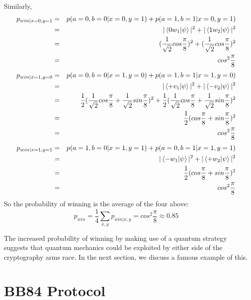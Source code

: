 Similarly,
\begin{eqnarray*}
p_{win|x=0,y=1}&=&p(a=0, b=0|x=0, y=1)+p(a=1, b=1|x=0, y=1)\\
&=&|\braket{0 w_1|\psi}|^2 + |\braket{1 w_2|\psi}|^2\\
&=&(\frac{1}{\sqrt{2}}cos\frac{\pi}{8})^2+(\frac{1}{\sqrt{2}}cos\frac{\pi}{8})^2\\
&=&cos^2 \frac{\pi}{8}
\end{eqnarray*}
\begin{eqnarray*}
p_{win|x=1,y=0}&=&p(a=0, b=0|x=1, y=0)+p(a=1, b=1|x=1, y=0)\\
&=&|\braket{+ v_1|\psi}|^2 + |\braket{- v_2|\psi}|^2\\
&=&\frac{1}{2}(\frac{1}{\sqrt{2}}cos\frac{\pi}{8}+\frac{1}{\sqrt{2}}sin\frac{\pi}{8})^2+\frac{1}{2}(\frac{1}{\sqrt{2}}cos\frac{\pi}{8}+\frac{1}{\sqrt{2}}sin\frac{\pi}{8})^2\\
&=&\frac{1}{2}(cos\frac{\pi}{8}+sin\frac{\pi}{8})^2\\
&=&cos^2 \frac{\pi}{8}
\end{eqnarray*}
\begin{eqnarray*}
p_{win|x=1,y=1}&=&p(a=1, b=0|x=1, y=1)+p(a=0, b=1|x=1, y=1)\\
&=&|\braket{- w_1|\psi}|^2 + |\braket{+ w_2|\psi}|^2\\
&=&\frac{1}{2}(cos\frac{\pi}{8}+sin\frac{\pi}{8})^2\\
&=&cos^2 \frac{\pi}{8}
\end{eqnarray*}
So the probability of winning is the average of the four above:
\begin{equation*}
    p_{win}=\frac{1}{4}\sum_{x,y}p_{win|x,y}=cos^2 \frac{\pi}{8} \approx 0.85
\end{equation*}


The increased probability of winning by making use of a quantum strategy suggests that quantum mechanics could be exploited by either side of the cryptography arms race.  In the next section, we discuss a famous example of this.




\pagebreak

\section{BB84 Protocol}

